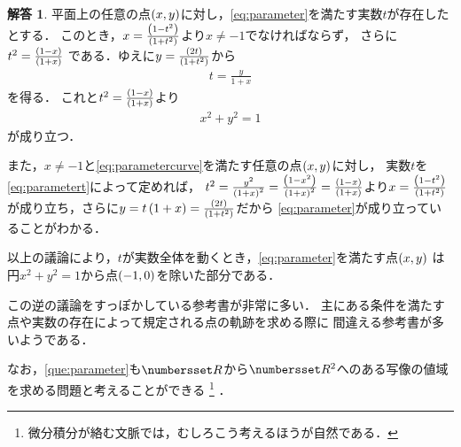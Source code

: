 \documentclass[11pt,a4paper]{ltjsarticle}
\newcommand*{\coord}[1]{\paren{#1}}
\theoremstyle{definition}
\newtheorem{ans}[dfn]{解答}
\begin{document}
\begin{ans} \label{ans:parameter}
  平面上の任意の点$\coord{x, y}$に対し，\cref{eq:parameter}を満たす実数$t$が存在したとする．
  このとき，$x = \frac{\paren*{1 - t^2}}{\paren*{1 + t^2}}$より$x \neq -1$でなければならず，
  さらに$t^2 = \frac{\paren*{1 - x}}{\paren*{1 + x}}$
  である．ゆえに$y = \frac{\paren*{2t}}{\paren*{1 + t^2}}$から
  \begin{align}
    t = \frac{y}{1 + x}
    \label{eq:parametert}
  \end{align}
  を得る．
  これと$t^2 = \frac{\paren*{1 - x}}{\paren*{1 + x}}$より
  \begin{align}
    x^2 + y^2 = 1
    \label{eq:parametercurve}
  \end{align}
  が成り立つ．

  また，$x \neq -1$と\cref{eq:parametercurve}を満たす任意の点$\coord{x, y}$に対し，
  実数$t$を\cref{eq:parametert}によって定めれば，
  $t^2 = \frac{y^2}{\paren*{1 + x}^2} = \frac{\paren*{1 - x^2}}{\paren*{1 + x}^2}
    = \frac{\paren*{1 - x}}{\paren*{1 + x}}$より$x = \frac{\paren*{1 - t^2}}{\paren*{1 + t^2}}$
  が成り立ち，さらに$y = t \paren{1 + x} = \frac{\paren*{2t}}{\paren*{1 + t^2}}$だから
  \cref{eq:parameter}が成り立っていることがわかる．

  以上の議論により，$t$が実数全体を動くとき，\cref{eq:parameter}を満たす点$\coord{x,y}$
  は円$x^2 + y^2 = 1$から点$\coord{-1, 0}$を除いた部分である．
\end{ans}

この逆の議論をすっぽかしている参考書が非常に多い．
主にある条件を満たす点や実数の存在によって規定される点の軌跡を求める際に
間違える参考書が多いようである．

なお，\cref{que:parameter}も$\Real$から$\Real^2$へのある写像の値域を求める問題と考えることができる%
\footnote{微分積分が絡む文脈では，むしろこう考えるほうが自然である．}%
．
\end{document}
